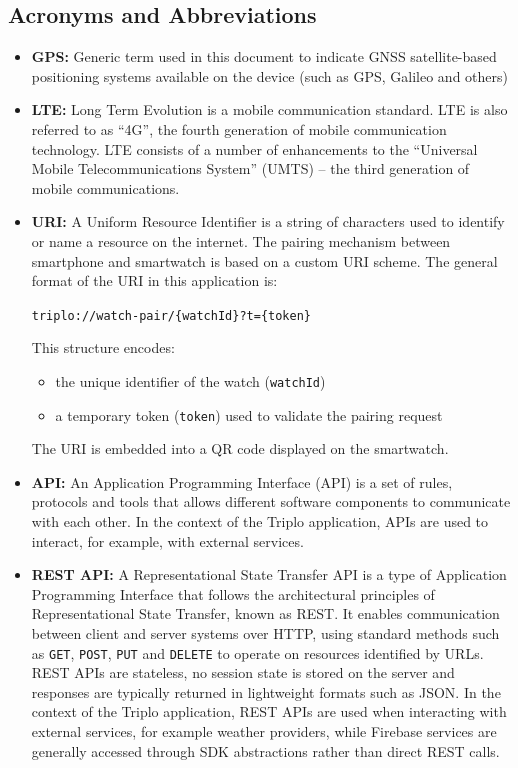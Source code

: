 \subsection{Acronyms and Abbreviations}
\begin{itemize}
    \item \label{GPS} \textbf{GPS:} Generic term used in this document to indicate GNSS satellite-based positioning systems available on the device (such as GPS, Galileo and others)
    \item \label{LTE} \textbf{LTE:} Long Term Evolution is a mobile communication standard. LTE is also referred to as “4G”, the fourth generation of mobile communication technology. LTE consists of a number of enhancements to the “Universal Mobile Telecommunications System” (UMTS) – the third generation of mobile communications.
    \item \label{URI} \textbf{URI:} A Uniform Resource Identifier is a string of characters used to identify or name a resource on the internet. The pairing mechanism between smartphone and smartwatch is based on a custom URI scheme. The general format of the URI in this application is: \\ 
                \begin{center}
                    \texttt{triplo://watch-pair/\{watchId\}?t=\{token\}}
                \end{center}    
                This structure encodes:
                \begin{itemize}
                    \item the unique identifier of the watch (\texttt{watchId})
                    \item a temporary token (\texttt{token}) used to validate the pairing request
                \end{itemize}
                The URI is embedded into a QR code displayed on the smartwatch.
    \item \label{API} \textbf{API:} An Application Programming Interface (API) is a set of rules, protocols and tools that allows different software components to communicate with each other. In the context of the Triplo application, APIs are used to interact, for example, with external services.
    \item \label{rest api} \textbf{REST API:} A Representational State Transfer API is a type of Application Programming Interface that follows the architectural principles of Representational State Transfer, known as REST. It enables communication between client and server systems over HTTP, using standard methods such as \texttt{GET}, \texttt{POST}, \texttt{PUT} and \texttt{DELETE} to operate on resources identified by URLs. REST APIs are stateless, no session state is stored on the server and responses are typically returned in lightweight formats such as JSON. In the context of the Triplo application, REST APIs are used when interacting with external services, for example weather providers, while Firebase services are generally accessed through SDK abstractions rather than direct REST calls.

\end{itemize}
